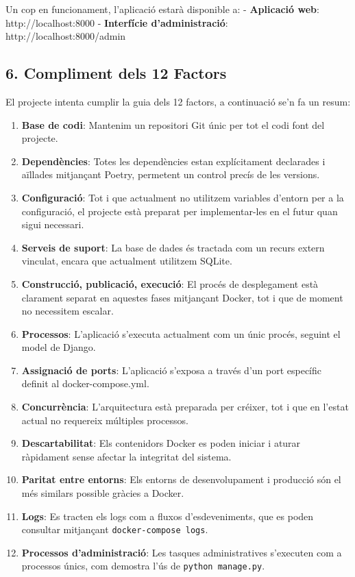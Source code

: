 Un cop en funcionament, l'aplicació estarà disponible a: -
\textbf{Aplicació web}: http://localhost:8000 - \textbf{Interfície
d'administració}: http://localhost:8000/admin

\hypertarget{compliment-dels-12-factors}{%
\subsection{6. Compliment dels 12
Factors}\label{compliment-dels-12-factors}}

El projecte intenta cumplir la guia dels 12 factors, a continuació se'n
fa un resum:

\begin{enumerate}
\def\labelenumi{\arabic{enumi}.}
\item
  \textbf{Base de codi}: Mantenim un repositori Git únic per tot el codi
  font del projecte.
\item
  \textbf{Dependències}: Totes les dependències estan explícitament
  declarades i aïllades mitjançant Poetry, permetent un control precís
  de les versions.
\item
  \textbf{Configuració}: Tot i que actualment no utilitzem variables
  d'entorn per a la configuració, el projecte està preparat per
  implementar-les en el futur quan sigui necessari.
\item
  \textbf{Serveis de suport}: La base de dades és tractada com un recurs
  extern vinculat, encara que actualment utilitzem SQLite.
\item
  \textbf{Construcció, publicació, execució}: El procés de desplegament
  està clarament separat en aquestes fases mitjançant Docker, tot i que
  de moment no necessitem escalar.
\item
  \textbf{Processos}: L'aplicació s'executa actualment com un únic
  procés, seguint el model de Django.
\item
  \textbf{Assignació de ports}: L'aplicació s'exposa a través d'un port
  específic definit al docker-compose.yml.
\item
  \textbf{Concurrència}: L'arquitectura està preparada per créixer, tot
  i que en l'estat actual no requereix múltiples processos.
\item
  \textbf{Descartabilitat}: Els contenidors Docker es poden iniciar i
  aturar ràpidament sense afectar la integritat del sistema.
\item
  \textbf{Paritat entre entorns}: Els entorns de desenvolupament i
  producció són el més similars possible gràcies a Docker.
\item
  \textbf{Logs}: Es tracten els logs com a fluxos d'esdeveniments, que
  es poden consultar mitjançant \texttt{docker-compose\ logs}.
\item
  \textbf{Processos d'administració}: Les tasques administratives
  s'executen com a processos únics, com demostra l'ús de
  \texttt{python\ manage.py}.
\end{enumerate}
